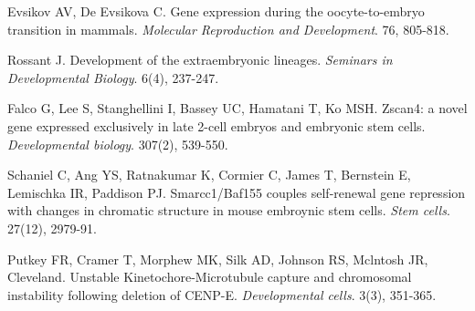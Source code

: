 \documentclass[10pt,letterpaper]{article}
\begin{document}
\begin{thebibliography}{9}
Evsikov AV, De Evsikova C.
Gene expression during the oocyte-to-embryo transition in mammals.
\textit{Molecular Reproduction and Development}. 76, 805-818.

Rossant J.
Development of the extraembryonic lineages.
\textit{Seminars in Developmental Biology}. 6(4), 237-247.

Falco G, Lee S, Stanghellini I, Bassey UC, Hamatani T, Ko MSH.
Zscan4: a novel gene expressed exclusively in late 2-cell embryos and embryonic stem cells.
\textit{Developmental biology}. 307(2), 539-550.

Schaniel C, Ang YS, Ratnakumar K, Cormier C, James T, Bernstein E, Lemischka IR, Paddison PJ.
Smarcc1/Baf155 couples self-renewal gene repression with changes in chromatic structure in mouse embroynic stem cells.
\textit{Stem cells}. 27(12), 2979-91.

Putkey FR, Cramer T, Morphew MK, Silk AD, Johnson RS, Mclntosh JR, Cleveland.
Unstable Kinetochore-Microtubule capture and chromosomal instability following deletion of CENP-E.
\textit{Developmental cells}. 3(3), 351-365.

\end{thebibliography}
\end{document}
